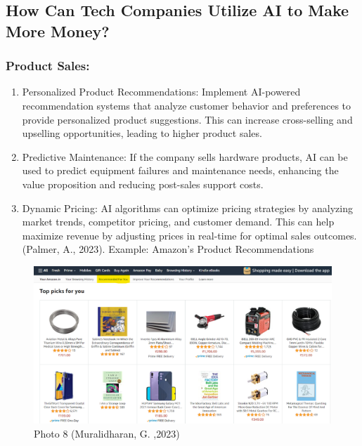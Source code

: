 \documentclass[
]{article}
\begin{document}
\hypertarget{how-can-tech-companies-utilize-ai-to-make-more-money}{%
\subsection{How Can Tech Companies Utilize AI to Make More Money?}\label{how-can-tech-companies-utilize-ai-to-make-more-money}}

\hypertarget{product-sales}{%
\subsubsection{Product Sales:}\label{product-sales}}

\begin{enumerate}
\def\labelenumi{\arabic{enumi}.}
\item
  Personalized Product Recommendations: Implement AI-powered recommendation systems that analyze customer behavior and preferences to provide personalized product suggestions. This can increase cross-selling and upselling opportunities, leading to higher product sales.
\item
  Predictive Maintenance: If the company sells hardware products, AI can be used to predict equipment failures and maintenance needs, enhancing the value proposition and reducing post-sales support costs.
\item
  Dynamic Pricing: AI algorithms can optimize pricing strategies by analyzing market trends, competitor pricing, and customer demand. This can help maximize revenue by adjusting prices in real-time for optimal sales outcomes.(Palmer, A., 2023). Example: Amazon's Product Recommendations
\end{enumerate}

\begin{figure}
\centering
\includegraphics{tech1.png}
\caption{Photo 8 (Muralidharan, G. ,2023)}
\end{figure}
\end{document}
